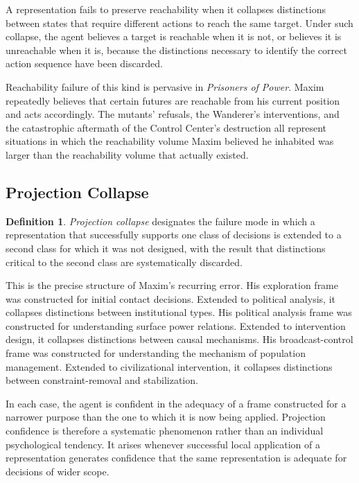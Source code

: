 \documentclass[12pt, a4paper]{article}
\theoremstyle{plain}
\theoremstyle{definition}
\newtheorem{definition}[theorem]{Definition}
\theoremstyle{remark}
\begin{document}
A representation fails to preserve reachability
when it collapses distinctions between states
that require different actions to reach the same
target. Under such collapse, the agent believes
a target is reachable when it is not, or believes
it is unreachable when it is, because the
distinctions necessary to identify the correct
action sequence have been discarded.

Reachability failure of this kind is pervasive
in \textit{Prisoners of Power}. Maxim repeatedly
believes that certain futures are reachable from
his current position and acts accordingly. The
mutants' refusals, the Wanderer's interventions,
and the catastrophic aftermath of the Control
Center's destruction all represent situations in
which the reachability volume Maxim believed he
inhabited was larger than the reachability volume
that actually existed.

\subsection{Projection Collapse}

\begin{definition}
\emph{Projection collapse} designates the failure
mode in which a representation that successfully
supports one class of decisions is extended to
a second class for which it was not designed,
with the result that distinctions critical to the
second class are systematically discarded.
\end{definition}

This is the precise structure of Maxim's recurring
error. His exploration frame was constructed for
initial contact decisions. Extended to political
analysis, it collapses distinctions between
institutional types. His political analysis frame
was constructed for understanding surface power
relations. Extended to intervention design, it
collapses distinctions between causal mechanisms.
His broadcast-control frame was constructed for
understanding the mechanism of population
management. Extended to civilizational
intervention, it collapses distinctions between
constraint-removal and stabilization.

In each case, the agent is confident in the
adequacy of a frame constructed for a narrower
purpose than the one to which it is now being
applied. Projection confidence is therefore a
systematic phenomenon rather than an individual
psychological tendency. It arises whenever
successful local application of a representation
generates confidence that the same representation
is adequate for decisions of wider scope.
\end{document}
